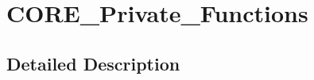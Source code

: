 \hypertarget{group___c_o_r_e___private___functions}{}\section{C\+O\+R\+E\+\_\+\+Private\+\_\+\+Functions}
\label{group___c_o_r_e___private___functions}


\subsection{Detailed Description}
